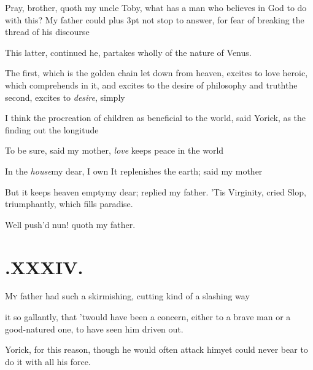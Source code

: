 \documentclass{article}
\begin{document}
\tsh Pray, brother, quoth my uncle Toby, what
has a man who believes in God to do with this? My father could\pb
\bgroup\parskip=3pt plus 3pt%
not
stop to answer, for fear of breaking the thread of his
discourse\tsh

This latter, continued he, partakes wholly of the nature of
Venus.

The first, which is the golden chain let down from heaven,
excites to love heroic, which comprehends in it, and excites to the
desire of philosophy and truth\tsh the second, excites to
\textit{desire}, simply\tsh

\tsh I think the procreation of children as beneficial
to the world, said Yorick, as the finding out the
longitude\tsh

\tsh To be sure, said my mother, \textit{love} keeps
peace in the world\tsh

\tsh In the \textit{house}\tsk my dear, I
own\tsk \break
\null\tsh It replenishes the earth; said my
mother\tsh

But it keeps heaven empty\tsk my dear; replied my father.
\egroup
\newpage
\tsk ’Tis Virginity, cried Slop,
triumphantly, which fills paradise.

Well push’d nun! quoth my father.

\section{.\enspace XXXIV.}

\lettrine{M}{y} father had such a skirmishing, cutting kind of a slashing way 

\noindent
{}
\pb it so gallantly,
that ’twould have been a concern, either to a brave man or
a\break
good-natured one, to have seen him\break
driven out.

Yorick, for this reason, though he would often attack
him\tsk yet could never bear to do it with all his force.
\end{document}
